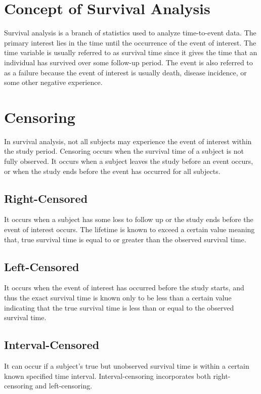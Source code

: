 \documentclass[doublespacing]{report} [12px]%
\begin{document}
\section{Concept of Survival Analysis}

Survival analysis is a branch of statistics used to analyze time-to-event data. The primary interest lies in the time until the occurrence of the event of interest.  The time variable is usually referred to as survival time since it gives the time that an individual has survived over some follow-up period. The event is also referred to as a failure because the event of interest is usually death, disease incidence, or some other negative experience. 

\section{Censoring}

In survival analysis, not all subjects may experience the event of interest within the study period. Censoring occurs when the survival time of a subject is not fully observed. It occurs when a subject leaves the study before an event occurs, or when the study ends before the event has occurred for all subjects.


\subsection{Right-Censored}

It occurs when a subject has some loss to follow up or the study ends before the event of interest occurs. The lifetime is known to exceed a certain value meaning that, true survival time is equal to or greater than the observed survival time.

\subsection{Left-Censored}

It occurs when the event of interest has occurred before the study starts, and thus the exact survival time is known only to be less than a certain value indicating that the true survival time is less than or equal to the observed survival time.

\subsection{Interval-Censored}

It can occur if a subject’s true but unobserved survival time is within a certain known specified time interval. Interval-censoring incorporates both right-censoring and left-censoring. 
\end{document}

